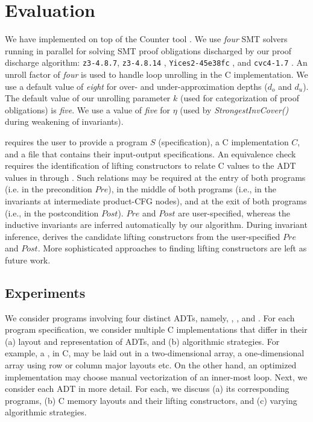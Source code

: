 \section{Evaluation}
\label{sec:eval}

We have implemented \toolName{} on top of the Counter tool \cite{oopsla20}.
We use {\em four} SMT solvers running in parallel for solving
SMT proof obligations discharged by our proof discharge algorithm:
{\tt z3-4.8.7}, {\tt z3-4.8.14} \cite{z3}, {\tt Yices2-45e38fc} \cite{yices}, and {\tt cvc4-1.7} \cite{cvc4solver}.
An unroll factor of {\em four} is used to handle loop unrolling in the C implementation.
We use a default value of {\em eight} for over- and under-approximation depths ($d_o$ and $d_u$).
The default value of our unrolling parameter $k$ (used for categorization of proof obligations) is {\em five}.
We use a value of {\em five} for $\eta$ (used by {\em StrongestInvCover()} during weakening of \recursiveRelation{} invariants).

\toolName{} requires the user to provide a \SpecL{} program $S$ (specification), a C implementation $C$,
and a file that contains their input-output specifications.
An equivalence check requires the identification of lifting constructors to relate C
values to the ADT values in \SpecL{} through  \recursiveRelations{}.
Such relations may be required at the entry of both programs (i.e. in the precondition $Pre$),
in the middle of both programs (i.e., in the invariants at intermediate product-CFG nodes),
and at the exit of both programs (i.e., in the postcondition $Post$).
$Pre$ and $Post$ are user-specified, whereas the inductive invariants are
inferred automatically by our algorithm.
During invariant inference, \toolName{} derives the candidate lifting constructors
from the user-specified $Pre$ and $Post$.
More sophisticated approaches to finding lifting constructors are left as future work.

\subsection{Experiments}
We consider programs involving four distinct ADTs, namely,
 ,  ,  
and  .
For each \SpecL{} program specification, we consider multiple
C implementations that differ in their (a) layout and representation of ADTs, and
(b) algorithmic strategies. For example, a , in C, may be laid out
in a two-dimensional array, a one-dimensional array using row or column major
layouts etc. On the other hand, an optimized implementation may choose manual vectorization
of an inner-most loop. Next, we consider each ADT in more detail. For each,
we discuss (a) its corresponding programs, (b) C memory layouts and their lifting
constructors, and (c) varying algorithmic strategies.

